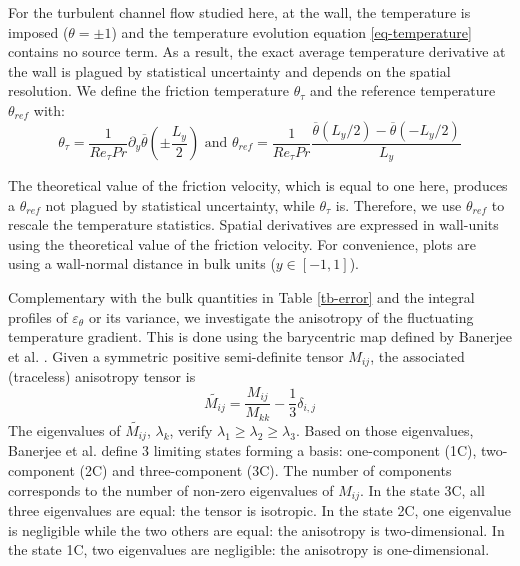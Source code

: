 \documentclass[review]{elsarticle}
\newcommand{\epst}{\varepsilon_\theta}
\begin{document}
For the turbulent channel flow studied here, at the wall, the temperature is imposed ($\theta = \pm 1$) and the temperature evolution equation \ref{eq-temperature} contains no source term. As a result, the exact average temperature derivative at the wall is plagued by statistical uncertainty and depends on the spatial resolution. We define the friction temperature $\theta_\tau$ and the reference temperature $\theta_{ref}$ with:
\begin{equation}
\theta_\tau = \frac{1}{Re_\tau Pr} \partial_y \overline{\theta} \left(\pm \frac{L_y}{2} \right)
\mbox{ and }
\theta_{ref} = \frac{1}{Re_\tau Pr} \frac{\overline{\theta}\left(L_y/2\right)-\overline{\theta}\left(-L_y/2\right)}{L_y}
\end{equation}

The theoretical value of the friction velocity, which is equal to one here, produces a $\theta_{ref}$ not plagued by statistical uncertainty, while $\theta_\tau$ is. Therefore, we use $\theta_{ref}$ to rescale the temperature statistics. Spatial derivatives are expressed in wall-units using the theoretical value of the friction velocity. For convenience, plots are using a wall-normal distance in bulk units ($y \in \left[ -1,1 \right]$).

Complementary with the bulk quantities in Table \ref{tb-error} and the integral profiles of $\epst$ or its variance, we investigate the anisotropy of the fluctuating temperature gradient. This is done using the barycentric map defined by Banerjee et al. \cite{banerjee2007presentation}. Given a symmetric positive semi-definite tensor $M_{ij}$, the associated (traceless) anisotropy tensor is
\begin{equation}
\widetilde{M_{ij}} = \frac{M_{ij}}{M_{kk}}-\frac{1}{3} \delta_{i,j}
\end{equation}
The eigenvalues of $\widetilde{M_{ij}}$, $\lambda_k$, verify $\lambda_1 \geq \lambda_2 \geq \lambda_3$. Based on those eigenvalues, Banerjee et al. \cite{banerjee2007presentation} define 3 limiting states forming a basis: one-component (1C), two-component (2C) and three-component (3C). The number of components corresponds to the number of non-zero eigenvalues of $M_{ij}$. In the state 3C, all three eigenvalues are equal: the tensor is isotropic. In the state 2C, one eigenvalue is negligible while the two others are equal: the anisotropy is two-dimensional. In the state 1C, two eigenvalues are negligible: the anisotropy is one-dimensional.
\end{document}
